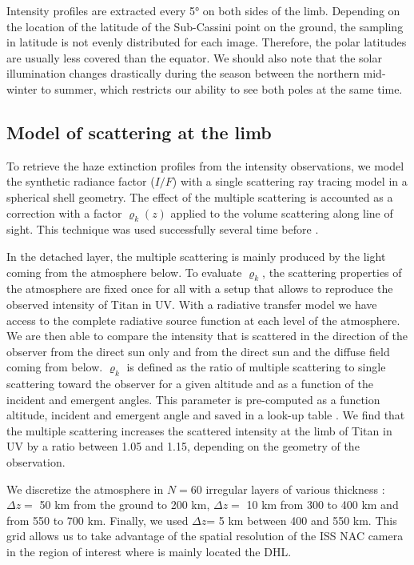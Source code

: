Intensity profiles are extracted every \ang{5} on both sides of the limb. Depending on the location of the
latitude of the Sub-Cassini point on the ground, the sampling in latitude is not evenly distributed for each image.
Therefore, the polar latitudes are usually less covered than the equator.
We should also note that the solar illumination changes drastically during the
season between the northern mid-winter to summer, which restricts our ability to see both poles at the same time.


\subsection{Model of scattering at the limb}

To retrieve the haze extinction profiles from the intensity observations, we model the synthetic
radiance factor ($I/F$) with a single scattering ray tracing model in a spherical shell geometry.
The effect of the multiple scattering is accounted as a correction with a factor $\varrho_k\left(z\right)$
applied to the volume scattering along line of sight.
This technique was used successfully several time before \citep[e.g.][]{Rages1983, Rannou1997, Seignovert2017, West2018}.

In the detached layer, the multiple scattering is mainly produced by the light coming from the atmosphere below. To
evaluate $\varrho_k$, the scattering properties of the atmosphere are fixed once for all with a setup that allows to
reproduce the observed intensity of Titan in UV. With a radiative transfer model \citep[SHDOMPP, from ][]{Evans1998}
we have access to the complete radiative source function at each level of the atmosphere. We are then able to compare the
intensity that is scattered in the direction of the observer from the direct sun only and from the direct sun and the diffuse
field coming from below. $\varrho_k$ is defined as the ratio of multiple scattering to single scattering toward the observer
for a given altitude and as a function of the incident and emergent angles. This parameter is pre-computed as a function
altitude, incident and emergent angle and saved in a look-up table \citep[see.][for details]{West2018}.
We find that the multiple scattering increases the scattered intensity at the limb of Titan in UV by a ratio between
1.05 and 1.15, depending on the geometry of the observation.

We discretize the atmosphere in $N=60$ irregular layers of various thickness : $\Delta z =$ 50 km from the
ground to 200 km, $\Delta z =$ 10 km from 300 to 400 km and from 550 to 700 km. Finally, we used
$\Delta z$= 5 km between 400 and 550 km. This grid allows us to take advantage of the spatial resolution
of the ISS NAC camera in the region of interest where is mainly located the DHL.

